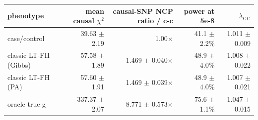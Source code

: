 \begin{tabular}{lrrrr}
\toprule
phenotype & mean causal $\chi^2$ & causal-SNP NCP ratio / c-c & power at 5e-8 & $\lambda_{\mathrm{GC}}$ \\
\midrule
case/control & 39.63 $\pm$ 2.19 & 1.00$\times$ & 41.1 $\pm$ 2.2\% & 1.011 $\pm$ 0.009 \\
classic LT-FH (Gibbs) & 57.58 $\pm$ 1.89 & 1.469 $\pm$ 0.040$\times$ & 48.9 $\pm$ 4.0\% & 1.008 $\pm$ 0.022 \\
classic LT-FH (PA) & 57.60 $\pm$ 1.91 & 1.469 $\pm$ 0.039$\times$ & 48.9 $\pm$ 4.0\% & 1.007 $\pm$ 0.021 \\
oracle true g & 337.37 $\pm$ 2.07 & 8.771 $\pm$ 0.573$\times$ & 75.6 $\pm$ 1.1\% & 1.047 $\pm$ 0.015 \\
\bottomrule
\end{tabular}
